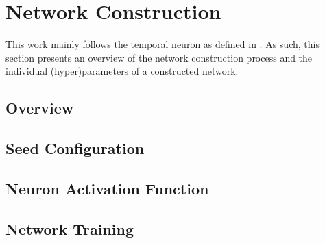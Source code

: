 \section{Network Construction}

This work mainly follows the temporal neuron as defined in \cite{TNN}. As such,
this section presents an overview of the network construction process and
the individual (hyper)parameters of a constructed network.

\subsection{Overview}

\subsection{Seed Configuration}

\subsection{Neuron Activation Function}

\subsection{Network Training}